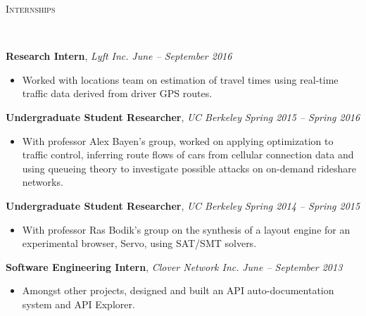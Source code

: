 \documentclass[9pt]{article}
\newenvironment{changemargin}[2]{%
  \begin{list}{}{%
      \setlength{\topsep}{0pt}%
      \setlength{\leftmargin}{#1}%
      \setlength{\rightmargin}{#2}%
      \setlength{\listparindent}{\parindent}%
      \setlength{\itemindent}{\parindent}%
      \setlength{\parsep}{\parskip}%
    }%
  \item[]}{\end{list}
}
\newcommand{\lineover}{
  \begin{changemargin}{-0.05in}{-0.05in}
    \vspace*{-8pt}
    \hrulefill \\
    \vspace*{-2pt}
  \end{changemargin}
}
\newcommand{\header}[1]{
  \begin{changemargin}{-0.5in}{-0.5in}
    \scshape{#1}\\
    \lineover
  \end{changemargin}
}
\newenvironment{body} {
  \vspace*{-16pt}
  \begin{changemargin}{-0.25in}{-0.5in}
  }
  {\end{changemargin}
}
\begin{document}
\header{Internships}
\begin{body}
  \vspace{14pt}
  \textbf{Research Intern}, \emph{Lyft Inc.} \hfill \emph{June -- September 2016}\\
  \vspace*{-5pt}
  \begin{itemize} \itemsep -0pt  %
  \item Worked with locations team on estimation of travel times using real-time
    traffic data derived from driver GPS routes.
  \end{itemize}

  \textbf{Undergraduate Student Researcher}, \emph{UC Berkeley} \hfill \emph{Spring 2015 -- Spring 2016}\\
  \vspace*{-4pt}
  \begin{itemize} \itemsep -0pt  %
  \item With professor Alex Bayen's group, worked on applying optimization to
    traffic control, inferring route flows of cars from cellular connection data
    and using queueing theory to investigate possible attacks on on-demand
    rideshare networks.
  \end{itemize}

  \textbf{Undergraduate Student Researcher}, \emph{UC Berkeley} \hfill \emph{Spring 2014 -- Spring 2015}\\
  \vspace*{-4pt}
  \begin{itemize} \itemsep -0pt  %
  \item With professor Ras Bodik's group on the synthesis of a layout engine
    for an experimental browser, Servo, using SAT/SMT solvers.
  \end{itemize}

  \textbf{Software Engineering Intern}, \emph{Clover Network Inc.} \hfill \emph{June -- September 2013}\\
  \vspace*{-5pt}
  \begin{itemize} \itemsep -0pt  %
  \item Amongst other projects, designed and built an API auto-documentation system and API Explorer.
  \end{itemize}
\end{body}
\smallskip
\end{document}
